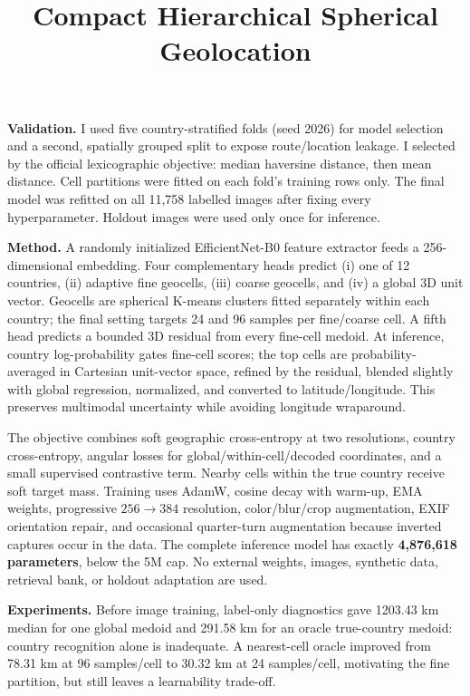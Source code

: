\documentclass[10pt]{article}
\title{Compact Hierarchical Spherical Geolocation}
\author{\todo{name / student ID}}
\date{}
\begin{document}
\maketitle
\vspace{-1.4em}

\textbf{Validation.}
I used five country-stratified folds (seed 2026) for model selection and a second, spatially grouped split to expose route/location leakage. I selected by the official lexicographic objective: median haversine distance, then mean distance. Cell partitions were fitted on each fold's training rows only. The final model was refitted on all 11,758 labelled images after fixing every hyperparameter. Holdout images were used only once for inference.

\textbf{Method.}
A randomly initialized EfficientNet-B0 feature extractor feeds a 256-dimensional embedding. Four complementary heads predict (i) one of 12 countries, (ii) adaptive fine geocells, (iii) coarse geocells, and (iv) a global 3D unit vector. Geocells are spherical K-means clusters fitted separately within each country; the final setting targets 24 and 96 samples per fine/coarse cell. A fifth head predicts a bounded 3D residual from every fine-cell medoid. At inference, country log-probability gates fine-cell scores; the top cells are probability-averaged in Cartesian unit-vector space, refined by the residual, blended slightly with global regression, normalized, and converted to latitude/longitude. This preserves multimodal uncertainty while avoiding longitude wraparound.

The objective combines soft geographic cross-entropy at two resolutions, country cross-entropy, angular losses for global/within-cell/decoded coordinates, and a small supervised contrastive term. Nearby cells within the true country receive soft target mass. Training uses AdamW, cosine decay with warm-up, EMA weights, progressive $256\!\rightarrow\!384$ resolution, color/blur/crop augmentation, EXIF orientation repair, and occasional quarter-turn augmentation because inverted captures occur in the data. The complete inference model has exactly \textbf{4,876,618 parameters}, below the 5M cap. No external weights, images, synthetic data, retrieval bank, or holdout adaptation are used.

\textbf{Experiments.}
Before image training, label-only diagnostics gave 1203.43 km median for one global medoid and 291.58 km for an oracle true-country medoid: country recognition alone is inadequate. A nearest-cell oracle improved from 78.31 km at 96 samples/cell to 30.32 km at 24 samples/cell, motivating the fine partition, but still leaves a learnability trade-off.
\end{document}
